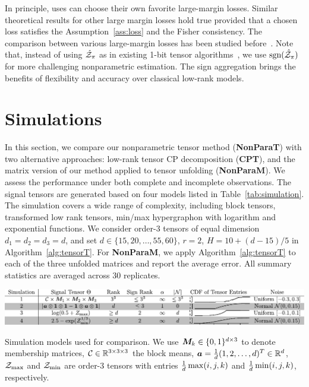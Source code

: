 \documentclass[twoside,11pt]{article}
\theoremstyle{plain}
\theoremstyle{definition}
\def\sign{\textup{sgn}}
\begin{document}
In principle, uses can choose their own favorite large-margin losses. Similar theoretical  results for other large margin losses  hold true provided that a chosen loss satisfies the Assumption~\ref{ass:loss} and the Fisher consistency.  The comparison between various large-margin losses has been studied before~\cite{bartlett2006convexity}. Note that, instead of using $\hat {\mathcal{Z}}_\pi$ as in existing 1-bit tensor algorithms~\cite{ghadermarzy2018learning,wang2018learning}, we use $\sign(\hat \tZ_\pi)$ for more challenging nonparametric estimation. The sign aggregation brings the benefits of flexibility and accuracy over classical low-rank models. 


\section{Simulations}\label{sec:simulation}

In this section, we compare our nonparametric tensor method ({\bf NonParaT}) with two alternative approaches: low-rank tensor CP decomposition ({\bf CPT}), and the matrix version of our method applied to tensor unfolding ({\bf NonParaM}). We assess the performance under both complete and incomplete observations. The signal tensors are generated based on four models listed in Table~\ref{tab:simulation}. The simulation covers a wide range of complexity, including block tensors, transformed low rank tensors, min/max hypergraphon with logarithm and exponential functions. We consider order-3  tensors of equal dimension $d_1=d_2=d_3=d$, and set $d\in \{15, 20,\ldots,55,60\}$, $r=2$, $H=10+{(d-15)/ 5}$ in Algorithm~\ref{alg:tensorT}. For {\bf NonParaM}, we apply Algorithm~\ref{alg:tensorT} to each of the three unfolded matrices and report the average error. All summary statistics are averaged across $30$ replicates.  

\begin{table}[h]
\includegraphics[width=1\textwidth]{figure/simulation2.pdf}
\caption{Simulation models used for comparison. We use $\bm M_k\in\{0,1\}^{d\times 3}$ to denote membership matrices, $\mathcal{C}\in\mathbb{R}^{3\times 3\times 3}$ the block means, $\bm{a}={1\over d}(1,2,\ldots,d)^T \in\mathbb{R}^d$, $\mathcal{Z}_{\max}$ and $\mathcal{Z}_{\min}$ are order-3 tensors with entries ${1\over d}\max(i,j,k)$ and ${1\over d}\min(i,j,k)$, respectively.}\label{tab:simulation}
\end{table}
\end{document}
